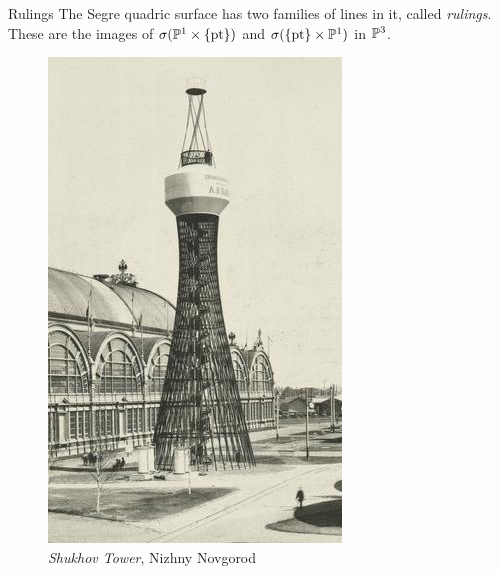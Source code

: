 \begin{frame}
    \begin{block}{Rulings}
    The Segre quadric surface has two families of lines in it, called \emph{rulings}. These are the images of $\sigma(\mathbb{P}^{1} \times \{ \text{pt} \} )$ and $\sigma( \{ \text{pt} \} \times \mathbb{P}^{1})$ in $\mathbb{P}^{3}$.
    \end{block}

    \begin{figure}[!htb]
    \centering
    \begin{minipage}{0.3\textwidth}
        \centering
        \includegraphics[height=0.5\textheight]{resources/shukhov-1.jpg}
        \caption{\emph{Shukhov Tower}, Nizhny Novgorod}
    \end{minipage}%
    \begin{minipage}{0.3\textwidth}
        \centering

\end{minipage}
\end{figure}
\end{frame}
